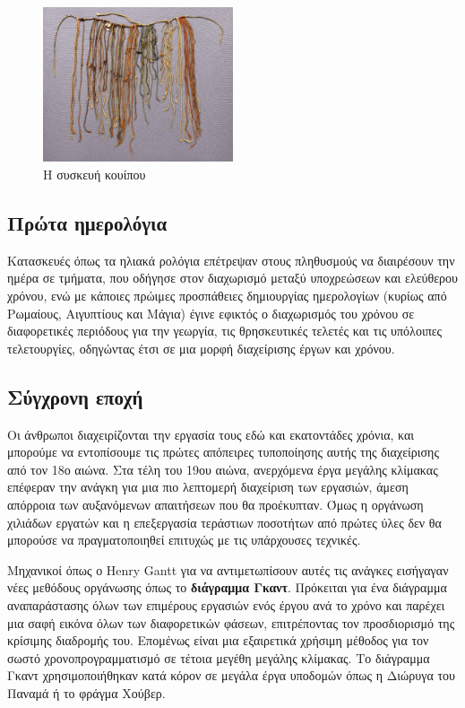             \begin{figure}[H] \noindent \centering
                \includegraphics[width=0.5\textwidth]{img/Quipo.jpg}
                \caption{Η συσκευή κουίπου}
            \end{figure}

        \subsection{Πρώτα ημερολόγια}
            Κατασκευές όπως τα ηλιακά ρολόγια επέτρεψαν στους πληθυσμούς να διαιρέσουν την ημέρα σε τμήματα, που οδήγησε στον διαχωρισμό μεταξύ υποχρεώσεων και ελεύθερου χρόνου, ενώ με κάποιες πρώιμες προσπάθειες δημιουργίας ημερολογίων (κυρίως από Ρωμαίους, Αιγυπτίους και Μάγια) έγινε εφικτός ο διαχωρισμός του χρόνου σε διαφορετικές περιόδους για την γεωργία, τις θρησκευτικές τελετές και τις υπόλοιπες τελετουργίες, οδηγώντας έτσι σε μια μορφή διαχείρισης έργων και χρόνου. \cite{Richards_2000}

        \subsection{Σύγχρονη εποχή}
            Οι άνθρωποι διαχειρίζονται την εργασία τους εδώ και εκατοντάδες χρόνια, και μπορούμε να εντοπίσουμε τις πρώτες απόπειρες τυποποίησης αυτής της διαχείρισης από τον 18ο αιώνα. Στα τέλη του 19ου αιώνα, ανερχόμενα έργα μεγάλης κλίμακας επέφεραν την ανάγκη για μια πιο λεπτομερή διαχείριση των εργασιών, άμεση απόρροια των αυξανόμενων απαιτήσεων που θα προέκυπταν. Όμως η οργάνωση χιλιάδων εργατών και η επεξεργασία τεράστιων ποσοτήτων από πρώτες ύλες δεν θα μπορούσε να πραγματοποιηθεί επιτυχώς με τις υπάρχουσες τεχνικές.
           
            Μηχανικοί όπως ο Henry Gantt για να αντιμετωπίσουν αυτές τις ανάγκες εισήγαγαν νέες μεθόδους οργάνωσης όπως το \textbf{διάγραμμα Γκαντ}. Πρόκειται για ένα διάγραμμα αναπαράστασης όλων των επιμέρους εργασιών ενός έργου ανά το χρόνο και παρέχει μια σαφή εικόνα όλων των  διαφορετικών φάσεων, επιτρέποντας τον προσδιορισμό της κρίσιμης διαδρομής του. Επομένως είναι μια εξαιρετικά χρήσιμη μέθοδος για τον σωστό χρονοπρογραμματισμό σε τέτοια μεγέθη μεγάλης κλίμακας. Το διάγραμμα Γκαντ χρησιμοποιήθηκαν κατά κόρον σε μεγάλα έργα υποδομών όπως η Διώρυγα του Παναμά ή το φράγμα Χούβερ. \cite{strefapmiHooverGreatest}
            
